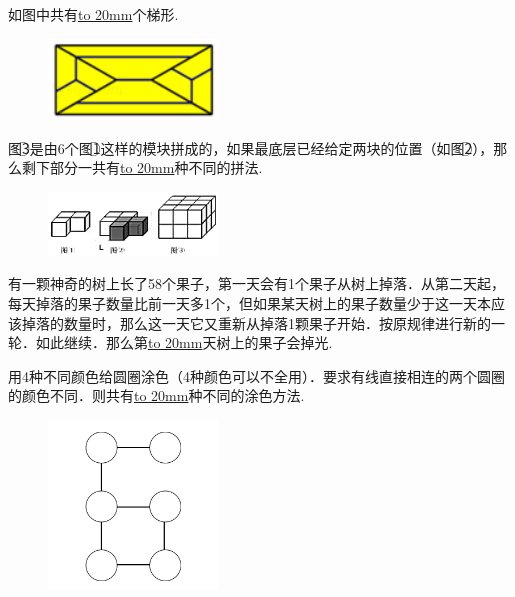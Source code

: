 \item {
    如图中共有\underline{\hbox to 20mm{}}个梯形.
    \begin{figure}[H] 
        \centering
        \includegraphics[width=0.4\textwidth]{./pics/Chapter_6/2016_1.png}
    \end{figure}
}

\item {
    图\textcircled{3}是由6个图\textcircled{1}这样的模块拼成的，如果最底层已经给定两块的位置（如图\textcircled{2}），那么剩下部分一共有\underline{\hbox to 20mm{}}种不同的拼法.
    \begin{figure}[H] 
        \centering
        \includegraphics[width=0.4\textwidth]{./pics/Chapter_6/2016_2.png}
    \end{figure}
}

\item {
    有一颗神奇的树上长了58个果子，第一天会有1个果子从树上掉落．从第二天起，每天掉落的果子数量比前一天多1个，但如果某天树上的果子数量少于这一天本应该掉落的数量时，那么这一天它又重新从掉落1颗果子开始．按原规律进行新的一轮．如此继续．那么第\underline{\hbox to 20mm{}}天树上的果子会掉光.
}


\item {
    用4种不同颜色给圆圈涂色（4种颜色可以不全用）．要求有线直接相连的两个圆圈的颜色不同．则共有\underline{\hbox to 20mm{}}种不同的涂色方法.
    \begin{figure}[H] 
        \centering
        \includegraphics[width=0.4\textwidth]{./pics/Chapter_6/2016_3.png}
    \end{figure}
}

